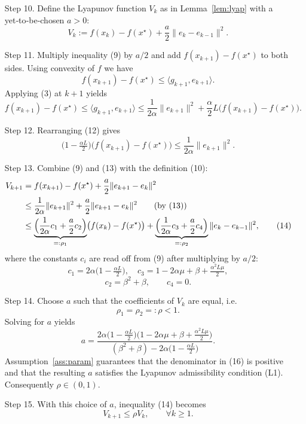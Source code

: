 \documentclass{article}
\begin{document}
\begin{enumerate}
\item[Step 10.]  Define the Lyapunov function $V_k$ as in Lemma~\ref{lem:lyap} with a yet‑to‑be‑chosen $a>0$:
\[
V_k:= f(x_k)-f(x^\star)+\frac{a}{2}\|e_k-e_{k-1}\|^2 .
\tag{10}
\]

\item[Step 11.]  Multiply inequality (9) by $a/2$ and add $f(x_{k+1})-f(x^\star)$ to both sides. Using convexity of $f$ we have
\[
f(x_{k+1})-f(x^\star)\le \langle g_{k+1},e_{k+1}\rangle .
\tag{11}
\]
Applying (3) at $k+1$ yields
\[
f(x_{k+1})-f(x^\star)\le \langle g_{k+1},e_{k+1}\rangle
\le \frac{1}{2\alpha}\|e_{k+1}\|^2
+\frac{\alpha}{2}L\bigl(f(x_{k+1})-f(x^\star)\bigr) .
\tag{12}
\]

\item[Step 12.]  Rearranging (12) gives
\[
\bigl(1-\tfrac{\alpha L}{2}\bigr)\bigl(f(x_{k+1})-f(x^\star)\bigr)
\le \frac{1}{2\alpha}\|e_{k+1}\|^2 .
\tag{13}
\]

\item[Step 13.]  Combine (9) and (13) with the definition (10):
\begin{align}
V_{k+1}
&= f(x_{k+1})-f(x^\star)+\frac{a}{2}\|e_{k+1}-e_k\|^2 \nonumber\\
&\le \frac{1}{2\alpha}\|e_{k+1}\|^2
+\frac{a}{2}\|e_{k+1}-e_k\|^2   \qquad\text{(by (13))} \nonumber\\
&\le \underbrace{\Bigl(\frac{1}{2\alpha}c_1 + \frac{a}{2}c_2\Bigr)}_{=: \rho_1}
\bigl(f(x_k)-f(x^\star)\bigr)
+\underbrace{\Bigl(\frac{1}{2\alpha}c_3 + \frac{a}{2}c_4\Bigr)}_{=: \rho_2}
\|e_k-e_{k-1}\|^2,
\tag{14}
\end{align}
where the constants $c_i$ are read off from (9) after multiplying by $a/2$:
\[
c_1 = 2\alpha\bigl(1-\tfrac{\alpha L}{2}\bigr),\quad
c_3 = 1-2\alpha\mu+\beta+\tfrac{\alpha^2L\mu}{2},
\]
\[
c_2 = \beta^2+\beta,\qquad
c_4 = 0 .
\]

\item[Step 14.]  Choose $a$ such that the coefficients of $V_k$ are equal, i.e.
\[
\rho_1=\rho_2=: \rho<1 .
\tag{15}
\]
Solving for $a$ yields
\[
a = \frac{2\alpha\bigl(1-\tfrac{\alpha L}{2}\bigr)\bigl(1-2\alpha\mu+\beta+\tfrac{\alpha^2L\mu}{2}\bigr)}
{(\beta^2+\beta)-2\alpha\bigl(1-\tfrac{\alpha L}{2}\bigr)} .
\tag{16}
\]
Assumption~\ref{ass:param} guarantees that the denominator in (16) is positive and that the resulting $a$ satisfies the Lyapunov admissibility condition (L1). Consequently $\rho\in(0,1)$.

\item[Step 15.]  With this choice of $a$, inequality (14) becomes
\[
V_{k+1}\le\rho V_k,\qquad\forall k\ge1 .
\tag{17}
\]


\end{enumerate}
\end{document}
